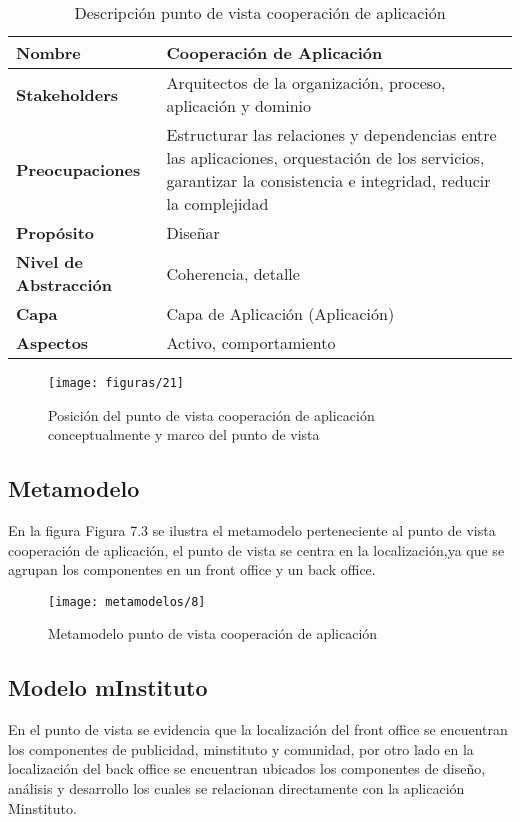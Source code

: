   \begin{table}[H]
  	\centering
  	\begin{tabular}{lp{8cm}}
  		\toprule
  		\textbf{Nombre} & \textbf{Cooperación de Aplicación} \\
  		\midrule
  		\textbf{Stakeholders} & Arquitectos de la organización, proceso, aplicación y dominio \\
  		\textbf{Preocupaciones} & Estructurar las relaciones y dependencias entre las aplicaciones, orquestación de los servicios, garantizar la consistencia e integridad, reducir la complejidad \\
  		\textbf{Propósito} & Diseñar \\
  		\textbf{Nivel de Abstracción} & Coherencia, detalle \\
  		\textbf{Capa} & Capa de Aplicación (Aplicación) \\
  		\textbf{Aspectos} & Activo, comportamiento \\
  		\bottomrule
  	\end{tabular}
  	\captionsetup{width=.95\textwidth}
  	\caption{Descripción punto de vista cooperación de aplicación}
  	\label{tabla11}
  \end{table}

\begin{figure}[H]
	\centering
	\texttt{[image: figuras/21]}
	\captionsetup{width=.95\textwidth}
	\caption{Posición del punto de vista cooperación de aplicación conceptualmente y marco del punto de vista}
	\label{figura21}
\end{figure}

\subsection{Metamodelo}
En la figura Figura 7.3 se ilustra el metamodelo perteneciente al punto de vista cooperación de aplicación, el punto de vista se centra en la localización,ya que se agrupan los componentes en un front office y un back office.

\begin{figure}[H]
	\centering
	\texttt{[image: metamodelos/8]}
	\captionsetup{width=.95\textwidth}
	\caption{Metamodelo punto de vista cooperación de aplicación}
	\label{metamodelo8}
\end{figure}

\subsection{Modelo mInstituto}
En el punto de vista se evidencia que la localización del front office se encuentran los componentes de publicidad, minstituto y comunidad, por otro lado en la localización del back office se encuentran ubicados los componentes de diseño, análisis y desarrollo los cuales se relacionan directamente con la aplicación Minstituto.

